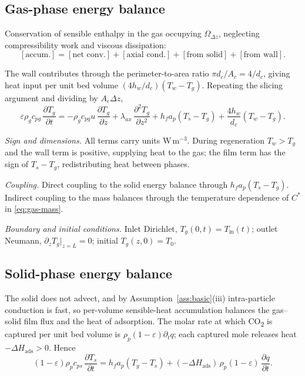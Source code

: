 \documentclass[a4paper,11pt]{amsart}
\theoremstyle{definition}
\begin{document}
\subsection{Gas-phase energy balance}

Conservation of sensible enthalpy in the gas occupying $\Omega_{\Delta z}$, neglecting compressibility work and viscous dissipation:
\[
[\text{accum.}] = [\text{net conv.}] + [\text{axial cond.}] + [\text{from solid}] + [\text{from wall}].
\]

The wall contributes through the perimeter-to-area ratio $\pi d_c/A_c=4/d_c$, giving heat input per unit bed volume $(4h_w/d_c)(T_w-T_g)$. Repeating the slicing argument and dividing by $A_c\Delta z$,
\begin{equation}\label{eq:gas-energy}
\varepsilon\rho_g c_{pg}\,\frac{\partial T_g}{\partial t}
=
-\rho_g c_{pg} u\,\frac{\partial T_g}{\partial z}
+ \lambda_{ax}\,\frac{\partial^2 T_g}{\partial z^2}
+ h_f a_p(T_s-T_g)
+ \frac{4h_w}{d_c}(T_w-T_g).
\end{equation}

\emph{Sign and dimensions.} All terms carry units W\,m$^{-3}$. During regeneration $T_w>T_g$ and the wall term is positive, supplying heat to the gas; the film term has the sign of $T_s-T_g$, redistributing heat between phases.

\emph{Coupling.} Direct coupling to the solid energy balance through $h_f a_p(T_s-T_g)$. Indirect coupling to the mass balances through the temperature dependence of $C^\ast$ in \eqref{eq:gas-mass}.

\emph{Boundary and initial conditions.} Inlet Dirichlet, $T_g(0,t)=T_{\text{in}}(t)$; outlet Neumann, $\partial_z T_g|_{z=L}=0$; initial $T_g(z,0)=T_0$.

\subsection{Solid-phase energy balance}\label{sec:solid-energy}

The solid does not advect, and by Assumption~\ref{ass:basic}(iii) intra-particle conduction is fast, so per-volume sensible-heat accumulation balances the gas--solid film flux and the heat of adsorption. The molar rate at which CO\textsubscript{2} is captured per unit bed volume is $\rho_p(1-\varepsilon)\partial_t q$; each captured mole releases heat $-\Delta H_{\text{ads}}>0$. Hence
\begin{equation}\label{eq:solid-energy}
(1-\varepsilon)\rho_p c_{ps}\,\frac{\partial T_s}{\partial t}
=
h_f a_p(T_g-T_s)
+ (-\Delta H_{\text{ads}})\,\rho_p(1-\varepsilon)\,\frac{\partial q}{\partial t}.
\end{equation}
\end{document}
